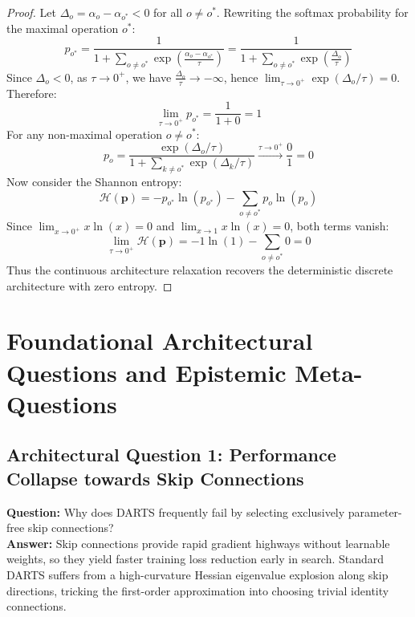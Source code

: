\documentclass[11pt,a4paper]{article}
\theoremstyle{definition}
\begin{document}
\begin{proof}
Let $\Delta_o = \alpha_o - \alpha_{o^*} < 0$ for all $o \neq o^*$.
Rewriting the softmax probability for the maximal operation $o^*$:
{\boldmath
\begin{equation}
p_{o^*} = \frac{1}{1 + \sum_{o \neq o^*} \exp\left( \frac{\alpha_o - \alpha_{o^*}}{\tau} \right)} = \frac{1}{1 + \sum_{o \neq o^*} \exp\left( \frac{\Delta_o}{\tau} \right)}
\end{equation}
}
Since $\Delta_o < 0$, as $\tau \to 0^+$, we have $\frac{\Delta_o}{\tau} \to -\infty$, hence $\lim_{\tau \to 0^+} \exp(\Delta_o / \tau) = 0$.
Therefore:
{\boldmath
\begin{equation}
\lim_{\tau \to 0^+} p_{o^*} = \frac{1}{1 + 0} = 1
\end{equation}
}
For any non-maximal operation $o \neq o^*$:
{\boldmath
\begin{equation}
p_o = \frac{\exp(\Delta_o / \tau)}{1 + \sum_{k \neq o^*} \exp(\Delta_k / \tau)} \xrightarrow{\tau \to 0^+} \frac{0}{1} = 0
\end{equation}
}
Now consider the Shannon entropy:
{\boldmath
\begin{equation}
\mathcal{H}(\mathbf{p}) = - p_{o^*} \ln(p_{o^*}) - \sum_{o \neq o^*} p_o \ln(p_o)
\end{equation}
}
Since $\lim_{x \to 0^+} x \ln(x) = 0$ and $\lim_{x \to 1} x \ln(x) = 0$, both terms vanish:
{\boldmath
\begin{equation}
\lim_{\tau \to 0^+} \mathcal{H}(\mathbf{p}) = - 1 \ln(1) - \sum_{o \neq o^*} 0 = 0
\end{equation}
}
Thus the continuous architecture relaxation recovers the deterministic discrete architecture with zero entropy.
\end{proof}

\section{Foundational Architectural Questions and Epistemic Meta-Questions}

\subsection{Architectural Question 1: Performance Collapse towards Skip Connections}
\textbf{Question:} Why does DARTS frequently fail by selecting exclusively parameter-free skip connections?\\
\textbf{Answer:} Skip connections provide rapid gradient highways without learnable weights, so they yield faster training loss reduction early in search. Standard DARTS suffers from a high-curvature Hessian eigenvalue explosion along skip directions, tricking the first-order approximation into choosing trivial identity connections.
\end{document}
